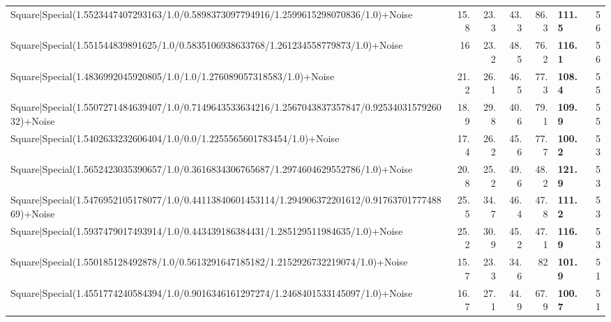 \begin{tabular}{lrrrrlr}
 Square|Special(1.5523447407293163/1.0/0.5898373097794916/1.2599615298070836/1.0)+Noise                                        &            15.8 &           23.3 &            43.3 &            86.3 & \textbf{111.5}  &           56 \\
 Square|Special(1.551544839891625/1.0/0.5835106938633768/1.261234558779873/1.0)+Noise                                          &            16   &           23.2 &            48.5 &            76.2 & \textbf{116.1}  &           56 \\
 Square|Special(1.4836992045920805/1.0/1.0/1.276089057318583/1.0)+Noise                                                        &            21.2 &           26.1 &            46.5 &            77.3 & \textbf{108.4}  &           55 \\
 Square|Special(1.5507271484639407/1.0/0.7149643533634216/1.2567043837357847/0.9253403157926032)+Noise                         &            18.9 &           29.8 &            40.6 &            79.1 & \textbf{109.9}  &           55 \\
 Square|Special(1.5402633232606404/1.0/0.0/1.2255565601783454/1.0)+Noise                                                       &            17.4 &           26.2 &            45.6 &            77.7 & \textbf{100.2}  &           53 \\
 Square|Special(1.5652423035390657/1.0/0.3616834306765687/1.2974604629552786/1.0)+Noise                                        &            20.8 &           25.2 &            49.6 &            48.2 & \textbf{121.9}  &           53 \\
 Square|Special(1.5476952105178077/1.0/0.44113840601453114/1.294906372201612/0.9176370177748869)+Noise                         &            25.5 &           34.7 &            46.4 &            47.8 & \textbf{111.2}  &           53 \\
 Square|Special(1.5937479017493914/1.0/0.443439186384431/1.285129511984635/1.0)+Noise                                          &            25.2 &           30.9 &            45.2 &            47.1 & \textbf{116.9}  &           53 \\
 Square|Special(1.550185128492878/1.0/0.5613291647185182/1.2152926732219074/1.0)+Noise                                         &            15.7 &           23.3 &            34.6 &            82   & \textbf{101.9}  &           51 \\
 Square|Special(1.4551774240584394/1.0/0.9016346161297274/1.2468401533145097/1.0)+Noise                                        &            16.7 &           27.1 &            44.9 &            67.9 & \textbf{100.7}  &           51 \\

\end{tabular}
